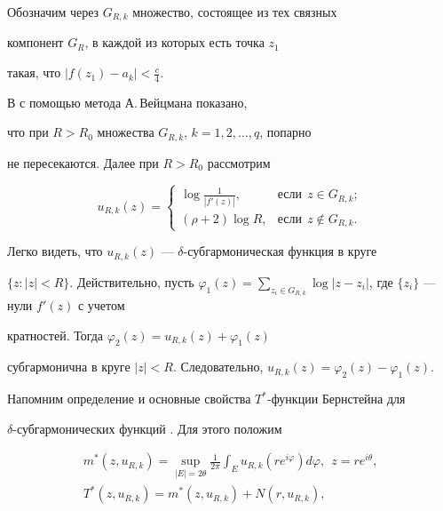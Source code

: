 Обозначим через $G_{R,k}$ множество, состоящее из тех связных


компонент $G_{R}$, в каждой из которых есть точка $z_{1}$


такая, что $| f(z_{1}) - a_{k}|< \frac{c}{4}$. 


В \cite{11} с помощью метода А.\,Вейцмана \cite{13} показано, 


что при $R>R_0$ множества $G_{R,k}$, $k=1,2,\dotsc,q$, попарно 


не пересекаются. Далее при $R>R_0$ рассмотрим


$$


u_{R,k}(z) =


\begin{cases}


\log \frac{1}{|f'(z)|},&


\text{если}\ \ z \in G_{R,k};\\


(\rho + 2 )\log R,&


\text{если}\ \ z \notin G_{R,k}.


\end{cases}


$$


Легко видеть, что $u_{R,k}(z)$ --- $\delta$-субгармоническая функция в круге


$\{z:|z|<R\}$. Действительно, пусть $\varphi_{1}(z)=\sum\limits_{z_{i}\in


G_{R,k}}\log |z-z_{i}|$, где $\{ z_{i}\}$ --- нули $f'(z)$ с учетом


кратностей. Тогда $\varphi_{2}(z)=u_{R,k}(z)+\varphi_{1}(z)$ 


субгармонична в круге $|z|<R $. Следовательно, $u_{R,k}(z)=


\varphi_{2}(z) - \varphi_{1}(z)$.





Напомним определение и основные свойства $T^{*}$-функции Бернстейна для


$\delta$-субгармонических функций \cite{14}. Для этого положим


\begin{gather*}


m^{*}(z,u_{R,k})=\sup\limits_{|E|=2\theta} \frac{1}{2\pi}


\int_E u_{R,k}(re^{i\varphi})d\varphi,\ \ z = re^{i\theta}, \\


%


T^{*}(z,u_{R,k})=m^{*}(z,u_{R,k})+N(r,u_{R,k}),


\end{gather*}


